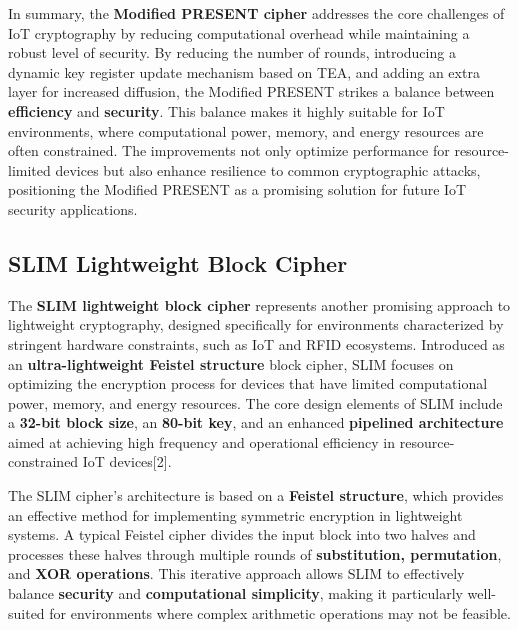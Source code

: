 \documentclass{article}
\begin{document}
In summary, the \textbf{Modified PRESENT cipher} addresses the core challenges of IoT cryptography by reducing computational overhead while maintaining a robust level of security. By reducing the number of rounds, introducing a dynamic key register update mechanism based on TEA, and adding an extra layer for increased diffusion, the Modified PRESENT strikes a balance between \textbf{efficiency} and \textbf{security}. This balance makes it highly suitable for IoT environments, where computational power, memory, and energy resources are often constrained. The improvements not only optimize performance for resource-limited devices but also enhance resilience to common cryptographic attacks, positioning the Modified PRESENT as a promising solution for future IoT security applications.

\subsection{SLIM Lightweight Block Cipher}

The \textbf{SLIM lightweight block cipher} represents another promising approach to lightweight cryptography, designed specifically for environments characterized by stringent hardware constraints, such as IoT and RFID ecosystems. Introduced as an \textbf{ultra-lightweight Feistel structure} block cipher, SLIM focuses on optimizing the encryption process for devices that have limited computational power, memory, and energy resources. The core design elements of SLIM include a \textbf{32-bit block size}, an \textbf{80-bit key}, and an enhanced \textbf{pipelined architecture} aimed at achieving high frequency and operational efficiency in resource-constrained IoT devices[2].

The SLIM cipher's architecture is based on a \textbf{Feistel structure}, which provides an effective method for implementing symmetric encryption in lightweight systems. A typical Feistel cipher divides the input block into two halves and processes these halves through multiple rounds of \textbf{substitution, permutation}, and \textbf{XOR operations}. This iterative approach allows SLIM to effectively balance \textbf{security} and \textbf{computational simplicity}, making it particularly well-suited for environments where complex arithmetic operations may not be feasible.
\end{document}
